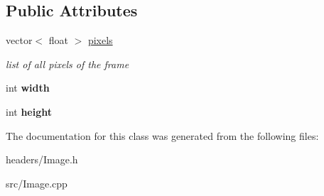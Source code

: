 \subsection*{Public Attributes}
\begin{DoxyCompactItemize}
\item 
\hypertarget{class_image_ac22dddb0c4b1136c745f0dce6db7a1dc}{vector$<$ float $>$ \hyperlink{class_image_ac22dddb0c4b1136c745f0dce6db7a1dc}{pixels}}\label{class_image_ac22dddb0c4b1136c745f0dce6db7a1dc}

\begin{DoxyCompactList}\small\item\em list of all pixels of the frame \end{DoxyCompactList}\item 
\hypertarget{class_image_ab8d12f635013c04159cd4d3d972bac88}{int {\bfseries width}}\label{class_image_ab8d12f635013c04159cd4d3d972bac88}

\item 
\hypertarget{class_image_a51df43db420c9c0b57536cb2dd36de5c}{int {\bfseries height}}\label{class_image_a51df43db420c9c0b57536cb2dd36de5c}

\end{DoxyCompactItemize}


The documentation for this class was generated from the following files\-:\begin{DoxyCompactItemize}
\item 
headers/Image.\-h\item 
src/Image.\-cpp\end{DoxyCompactItemize}
